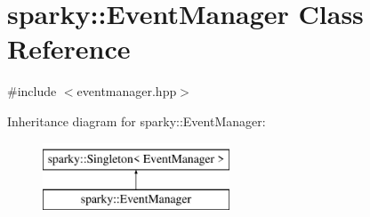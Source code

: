 \hypertarget{classsparky_1_1_event_manager}{}\section{sparky\+:\+:Event\+Manager Class Reference}
\label{classsparky_1_1_event_manager}


{\ttfamily \#include $<$eventmanager.\+hpp$>$}

Inheritance diagram for sparky\+:\+:Event\+Manager\+:\begin{figure}[H]
\begin{center}
\leavevmode
\includegraphics[height=2.000000cm]{classsparky_1_1_event_manager}
\end{center}
\end{figure}
